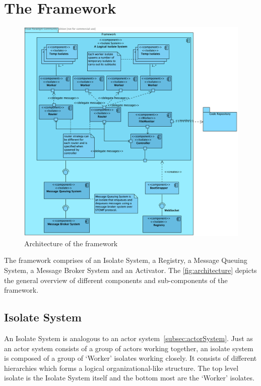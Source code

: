 \section{The Framework}
\begin{figure}[H]
  \centering
  \includegraphics[width=1\textwidth]{figures/componentDiagram}
  \caption[Architecture of the framework]{Architecture of the framework}
  \label{fig:architecture}
\end{figure}


The framework comprises of an Isolate System, a Registry, a Message Queuing System, a Message Broker System and an Activator. The \autoref{fig:architecture} depicts the general overview of different components and sub-components of the framework.

  \subsection{Isolate System}
  An Isolate System is analogous to an actor system~\autoref{subsec:actorSystem}. Just as an actor system consists of a group of actors working together, an isolate system is composed of a group of ‘Worker’ isolates working closely. It consists of different hierarchies which forms a logical organizational-like structure. The top level isolate is the Isolate System itself and the bottom most are the ‘Worker’ isolates.

